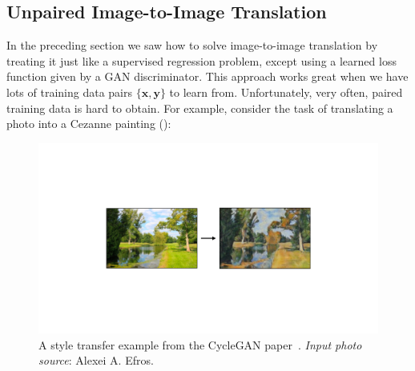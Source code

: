 


\subsection{Unpaired Image-to-Image Translation}

In the preceding section we saw how to solve image-to-image translation by treating it just like a supervised regression problem, except using a learned loss function given by a GAN discriminator. This approach works great when we have lots of training data pairs $\{\mathbf{x}, \mathbf{y}\}$ to learn from. Unfortunately, very often, paired training data is hard to obtain. For example, consider the task of translating a photo into a Cezanne painting (\fig{\ref{fig:conditional_generative_models:cyclegan_teaser}}):
\begin{figure}[h!]
    \centerline{
    \includegraphics[width=0.6\linewidth]{./figures/conditional_generative_models/cyclegan_teaser.pdf}
    }
    \caption{A style transfer example from the CycleGAN paper~\cite{CycleGAN2017}. \textit{Input photo source}: Alexei A. Efros.}
    \label{fig:conditional_generative_models:cyclegan_teaser}
\end{figure}

